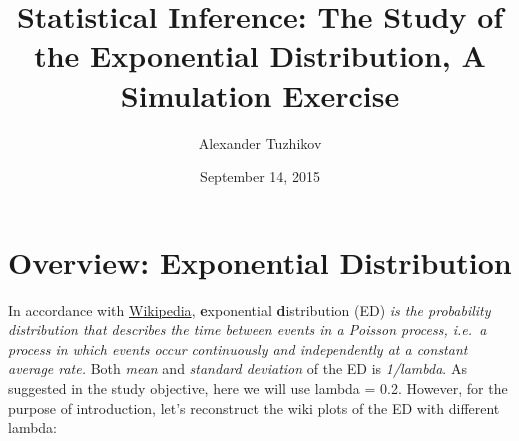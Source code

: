 \documentclass[]{article}
\title{Statistical Inference: The Study of the Exponential Distribution, A
Simulation Exercise}
\author{Alexander Tuzhikov}
\date{September 14, 2015}
\begin{document}
\maketitle

{
\hypersetup{linkcolor=black}
\setcounter{tocdepth}{2}
\tableofcontents
}
\section{Overview: Exponential
Distribution}\label{overview-exponential-distribution}

In accordance with
\href{https://en.wikipedia.org/wiki/Exponential_distribution}{Wikipedia},
\textbf{e}xponential \textbf{d}istribution (ED) \emph{is the probability
distribution that describes the time between events in a Poisson
process, i.e.~a process in which events occur continuously and
independently at a constant average rate.} Both \emph{mean} and
\emph{standard deviation} of the ED is \emph{1/lambda}. As suggested in
the study objective, here we will use lambda = 0.2. However, for the
purpose of introduction, let's reconstruct the wiki plots of the ED with
different lambda:
\end{document}
